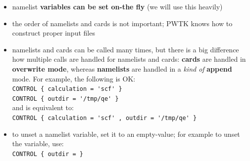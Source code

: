 \documentclass[landscape]{foils}
\begin{document}
\begin{itemize}
  \vspace{-0.5em}
\item namelist {\bf variables can be set on-the fly} (we will use this
  heavily)

  \vspace{-0.5em}
\item the order of namelists and cards is not important; PWTK knows
  how to construct proper input files

  \vspace{-0.5em}
\item namelists and cards can be called many times, but there is a big
  difference how multiple calls are handled for namelists and cards:
  {\bf cards} are handled in {\bf overwrite mode}, whereas {\bf
    namelists} are handled in a {\it kind of} {\bf
    append} mode. For example, the following is OK:\\[0.5em]
  {\codecolor\verb+CONTROL { calculation = 'scf' }+}\\
  {\codecolor\verb+CONTROL { outdir = '/tmp/qe' }+}\\[0.5em]
  and is equivalent to:\\[0.5em]
  {\codecolor\verb+CONTROL { calculation = 'scf' , outdir = '/tmp/qe' }+}

  \vspace{-0.5em}
\item to unset a namelist variable, set it to an empty-value; for example
  to unset the  variable, use:\\[0.5em]
  {\codecolor\verb+CONTROL { outdir = }+}


\end{itemize}
\end{document}
